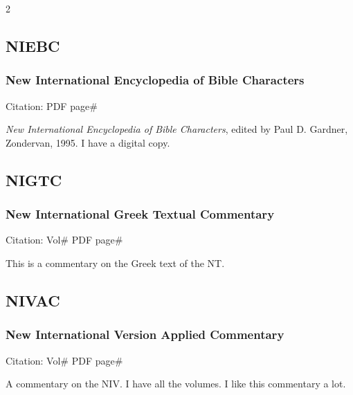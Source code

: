 \begin{multicols}{2}
	\subsection*{NIEBC}
	
		\subsubsection*{New International Encyclopedia of Bible Characters}
		
			Citation:
				PDF page\#
		
			\textit{New International Encyclopedia of Bible Characters}, edited by Paul D. Gardner, Zondervan, 1995. I have a digital copy.
			
	\subsection*{NIGTC}
	
		\subsubsection*{New International Greek Textual Commentary}
		
			Citation:
				Vol\# PDF page\#
				
			This is a commentary on the Greek text of the NT.
			
	\subsection*{NIVAC}
	
		\subsubsection*{New International Version Applied Commentary}
		
			Citation:
				Vol\# PDF page\#
				
			A commentary on the NIV. I have all the volumes. I like this commentary a lot.
			

\end{multicols}
